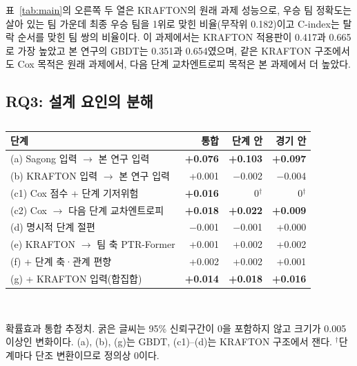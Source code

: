 표~\ref{tab:main}의 오른쪽 두 열은 KRAFTON의 원래 과제 성능으로, 우승 팀 정확도는  살아 있는 팀 가운데 최종 우승 팀을 1위로 맞힌 비율(무작위 0.182)이고 C-index는 탈락 순서를 맞힌 팀 쌍의 비율이다.
이 과제에서는 KRAFTON 적용판이 0.417과 0.665로 가장 높았고 본 연구의 GBDT는 0.351과 0.654였으며, 같은 KRAFTON 구조에서도 Cox 목적은 원래 과제에서, 다음 단계 교차엔트로피 목적은 본 과제에서 더 높았다.

\subsection{RQ3: 설계 요인의 분해}
\label{sec:results:rq3}

\begin{table}[t]
\centering
\caption{}
\label{tab:steps}
\footnotesize
\setlength{\tabcolsep}{3.5pt}
\begin{tabular}{lrrr}
\hline
단계 & 통합 & 단계 안 & 경기 안 \\
\hline
(a) Sagong 입력 $\to$ 본 연구 입력 & \textbf{+0.076} & \textbf{+0.103} & \textbf{+0.097} \\
(b) KRAFTON 입력 $\to$ 본 연구 입력 & +0.001 & $-$0.002 & $-$0.004 \\
(c1) Cox 점수 + 단계 기저위험 & \textbf{+0.016} & 0$^\dagger$ & 0$^\dagger$ \\
(c2) Cox $\to$ 다음 단계 교차엔트로피 & \textbf{+0.018} & \textbf{+0.022} & \textbf{+0.009} \\
(d) 명시적 단계 절편 & $-$0.001 & $-$0.001 & +0.000 \\
(e) KRAFTON $\to$ 팀 축 PTR-Former & +0.001 & +0.002 & +0.002 \\
(f) + 단계 축·관계 편향 & +0.002 & +0.002 & +0.001 \\
(g) + KRAFTON 입력(합집합) & \textbf{+0.014} & \textbf{+0.018} & \textbf{+0.016} \\
\hline
\end{tabular}
\\[2pt]
\parbox{\columnwidth}{\scriptsize 확률효과 통합 추정치. 굵은 글씨는 95\% 신뢰구간이 0을 포함하지 않고 크기가 0.005 이상인 변화이다. (a), (b), (g)는 GBDT, (c1)--(d)는 KRAFTON 구조에서 잰다. $^\dagger$단계마다 단조 변환이므로 정의상 0이다.}
\end{table}

